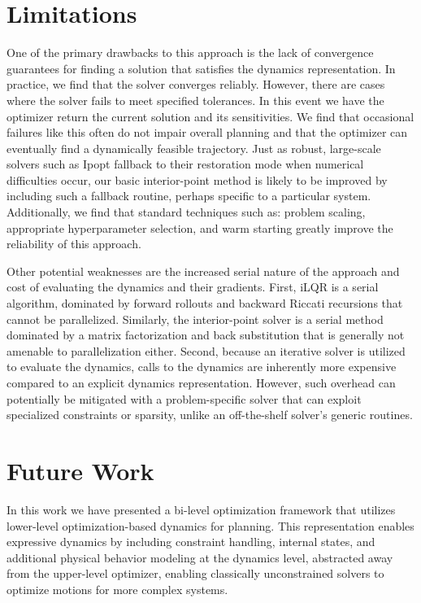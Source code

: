 \section{Limitations}\label{od_limitations}

One of the primary drawbacks to this approach is the lack of convergence guarantees for finding a solution that satisfies the dynamics representation. In practice, we find that the solver converges reliably. However, there are cases where the solver fails to meet specified tolerances. In this event we have the optimizer return the current solution and its sensitivities. We find that occasional failures like this often do not impair overall planning and that the optimizer can eventually find a dynamically feasible trajectory. Just as robust, large-scale solvers such as Ipopt \cite{wachter2006implementation} fallback to their restoration mode when numerical difficulties occur, our basic interior-point method is likely to be improved by including such a fallback routine, perhaps specific to a particular system. Additionally, we find that standard techniques such as: problem scaling, appropriate hyperparameter selection, and warm starting greatly improve the reliability of this approach.

Other potential weaknesses are the increased serial nature of the approach and cost of evaluating the dynamics and their gradients. First, iLQR is a serial algorithm, dominated by forward rollouts and backward Riccati recursions that cannot be parallelized. Similarly, the interior-point solver is a serial method dominated by a matrix factorization and back substitution that is generally not amenable to parallelization either. Second, because an iterative solver is utilized to evaluate the dynamics, calls to the dynamics are inherently more expensive compared to an explicit dynamics representation. However, such overhead can potentially be mitigated with a problem-specific solver that can exploit specialized constraints or sparsity, unlike an off-the-shelf solver's generic routines.

\section{Future Work} \label{od_future_work}
In this work we have presented a bi-level optimization framework that utilizes lower-level optimization-based dynamics for planning. This representation enables expressive dynamics by including constraint handling, internal states, and additional physical behavior modeling at the dynamics level, abstracted away from the upper-level optimizer, enabling classically unconstrained solvers to optimize motions for more complex systems.

